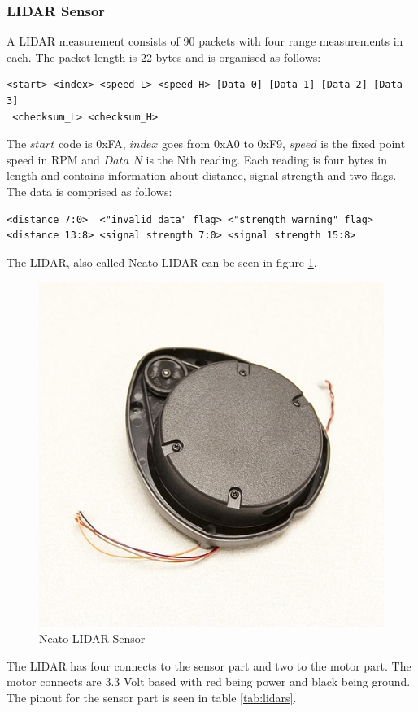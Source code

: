 \subsubsection{LIDAR Sensor}
A LIDAR measurement consists of 90 packets with four range measurements in each. The packet length is 22 bytes and is organised as follows\cite{LIDAR}:
\begin{verbatim}
<start> <index> <speed_L> <speed_H> [Data 0] [Data 1] [Data 2] [Data 3]
 <checksum_L> <checksum_H>
\end{verbatim}
The $start$ code is 0xFA, $index$ goes from 0xA0 to 0xF9, $speed$ is the fixed point speed in RPM and $Data$ $N$ is the Nth reading. Each reading is four bytes in length and contains information about distance, signal strength and two flags. The data is comprised as follows:
\begin{verbatim}
<distance 7:0>  <"invalid data" flag> <"strength warning" flag> 
<distance 13:8> <signal strength 7:0> <signal strength 15:8>
\end{verbatim}
The LIDAR, also called Neato LIDAR can be seen in figure \ref{fig:NeatoLidar}.
\begin{figure}[H]
\centering
\includegraphics[scale=1]{billeder/NeatoLidar}
\caption{Neato LIDAR Sensor}
\label{fig:NeatoLidar}
\end{figure}
The LIDAR has four connects to the sensor part and two to the motor part. The motor connects are 3.3 Volt based with red being power and black being ground. The pinout for the sensor part is seen in table \ref{tab:lidars}.
